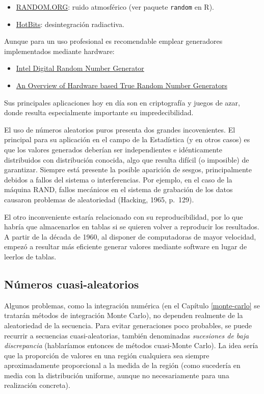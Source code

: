 \documentclass[
]{book}
\theoremstyle{break}
\theoremstyle{nonumberplain}
\begin{document}
\begin{itemize}
\item
  \href{http://www.random.org/integers}{RANDOM.ORG}: ruido atmosférico
  (ver paquete \texttt{random} en R).
\item
  \href{http://www.fourmilab.ch/hotbits}{HotBits}: desintegración radiactiva.
\end{itemize}

Aunque para un uso profesional es recomendable emplear generadores implementados mediante hardware:

\begin{itemize}
\item
  \href{http://software.intel.com/en-us/articles/intel-digital-random-number-generator-drng-software-implementation-guide}{Intel Digital Random Number Generator}
\item
  \href{https://rbridge.inlab.net/manual/trngs}{An Overview of Hardware based True Random Number Generators}
\end{itemize}

Sus principales aplicaciones hoy en día son en criptografía y juegos de azar, donde resulta especialmente importante su impredecibilidad.

El uso de números aleatorios puros presenta dos grandes incovenientes.
El principal para su aplicación en el campo de la Estadística (y en otros casos) es que los valores generados deberían ser independientes e idénticamente distribuidos con distribución conocida, algo que resulta difícil (o imposible) de garantizar.
Siempre está presente la posible aparición de sesgos, principalmente debidos a fallos del sistema o interferencias.
Por ejemplo, en el caso de la máquina RAND, fallos mecánicos en el sistema de grabación de los datos causaron problemas de aleatoriedad (Hacking, 1965, p.~129).

El otro inconveniente estaría relacionado con su reproducibilidad, por lo que habría que almacenarlos en tablas si se quieren volver a reproducir los resultados.
A partir de la década de 1960, al disponer de computadoras de mayor velocidad, empezó a resultar más eficiente generar valores mediante software en lugar de leerlos de tablas.

\hypertarget{nuxfameros-cuasi-aleatorios}{%
\subsection{Números cuasi-aleatorios}\label{nuxfameros-cuasi-aleatorios}}

Algunos problemas, como la integración numérica (en el Capítulo \ref{monte-carlo} se tratarán métodos de integración Monte Carlo), no dependen realmente de la aleatoriedad de la secuencia. Para evitar generaciones poco probables, se puede recurrir a secuencias cuasi-aleatorias, también denominadas \emph{sucesiones de baja discrepancia} (hablaríamos entonces de métodos cuasi-Monte Carlo). La idea sería que la proporción de valores en una región cualquiera sea siempre aproximadamente proporcional a la medida de la región (como sucedería en media con la distribución uniforme, aunque no necesariamente para una realización concreta).
\end{document}
